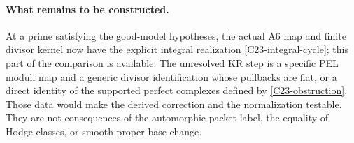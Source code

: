 \paragraph{What remains to be constructed.}
At a prime satisfying the good-model hypotheses, the actual
A6 map and finite divisor kernel now have the explicit
integral realization \eqref{C23-integral-cycle}; this part of
the comparison is available.  The unresolved KR step is a
specific PEL moduli map and a generic divisor identification
whose pullbacks are flat, or a direct identity of the
supported perfect complexes defined by
\eqref{C23-obstruction}.  Those data would make the
derived correction and the normalization testable.
They are not consequences of the automorphic packet label,
the equality of Hodge classes, or smooth proper base change.
